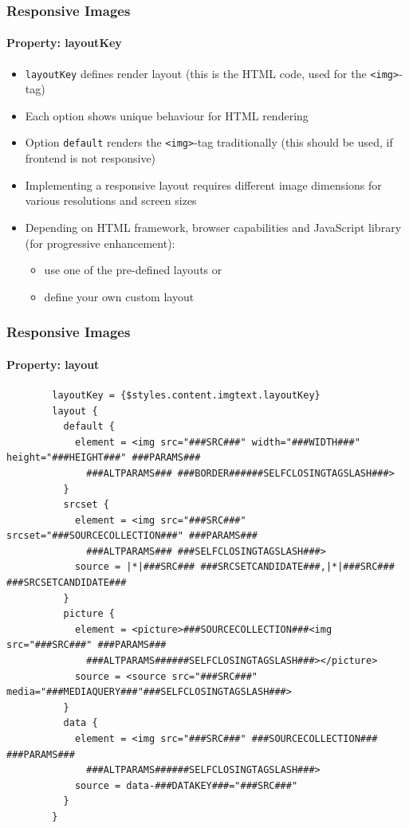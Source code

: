 \begin{frame}[fragile]
	\frametitle{Responsive Images}
	\framesubtitle{Property: layoutKey}

	\begin{itemize}
		\item \texttt{layoutKey} defines render layout\newline
			(this is the HTML code, used for the \texttt{<img>}-tag)
		\item Each option shows unique behaviour for HTML rendering
		\item Option \texttt{default} renders the \texttt{<img>}-tag traditionally\newline
			(this should be used, if frontend is not responsive)
		\item Implementing a responsive layout requires different image dimensions for various resolutions and screen sizes
		\item Depending on HTML framework, browser capabilities and JavaScript library (for progressive enhancement):

			\begin{itemize}
				\item use one of the pre-defined layouts or
				\item define your own custom layout
			\end{itemize}

	\end{itemize}

\end{frame}


\begin{frame}[fragile]
	\frametitle{Responsive Images}
	\framesubtitle{Property: layout}

	\lstset{
		basicstyle=\tiny\ttfamily
	}

	\begin{lstlisting}
		layoutKey = {$styles.content.imgtext.layoutKey}
		layout {
		  default {
		    element = <img src="###SRC###" width="###WIDTH###" height="###HEIGHT###" ###PARAMS###
		      ###ALTPARAMS### ###BORDER######SELFCLOSINGTAGSLASH###>
		  }
		  srcset {
		    element = <img src="###SRC###" srcset="###SOURCECOLLECTION###" ###PARAMS###
		      ###ALTPARAMS### ###SELFCLOSINGTAGSLASH###>
		    source = |*|###SRC### ###SRCSETCANDIDATE###,|*|###SRC### ###SRCSETCANDIDATE###
		  }
		  picture {
		    element = <picture>###SOURCECOLLECTION###<img src="###SRC###" ###PARAMS###
		      ###ALTPARAMS######SELFCLOSINGTAGSLASH###></picture>
		    source = <source src="###SRC###" media="###MEDIAQUERY###"###SELFCLOSINGTAGSLASH###>
		  }
		  data {
		    element = <img src="###SRC###" ###SOURCECOLLECTION### ###PARAMS###
		      ###ALTPARAMS######SELFCLOSINGTAGSLASH###>
		    source = data-###DATAKEY###="###SRC###"
		  }
		}
	\end{lstlisting}

\end{frame}

